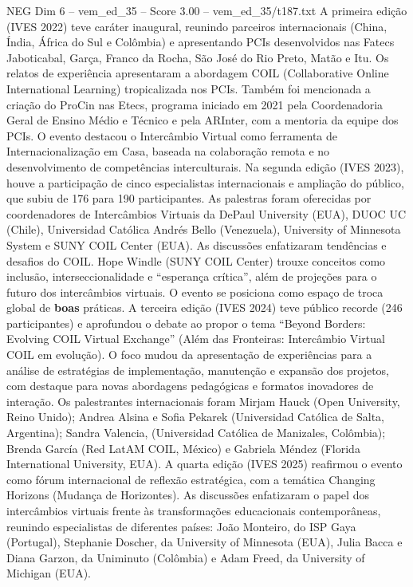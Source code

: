 \begin{textsample}{NEG Dim 6 – vem\_ed\_35 – Score 3.00 – vem\_ed\_35/t187.txt}
A primeira edição (IVES 2022) teve caráter inaugural, reunindo parceiros internacionais (China, Índia, África do Sul e Colômbia) e apresentando PCIs desenvolvidos nas Fatecs Jaboticabal, Garça, Franco da Rocha, São José do Rio Preto, Matão e Itu.
Os relatos de experiência apresentaram a abordagem COIL (Collaborative Online International Learning) tropicalizada nos PCIs.
Também foi mencionada a criação do ProCin nas Etecs, programa iniciado em 2021 pela Coordenadoria Geral de Ensino Médio e Técnico e pela ARInter, com a mentoria da equipe dos PCIs.
O evento destacou o Intercâmbio Virtual como ferramenta de Internacionalização em Casa, baseada na colaboração remota e no desenvolvimento de competências interculturais.
Na segunda edição (IVES 2023), houve a participação de cinco especialistas internacionais e ampliação do público, que subiu de 176 para 190 participantes.
As palestras foram oferecidas por coordenadores de Intercâmbios Virtuais da DePaul University (EUA), DUOC UC (Chile), Universidad Católica Andrés Bello (Venezuela), University of Minnesota System e SUNY COIL Center (EUA).
As discussões enfatizaram tendências e desafios do COIL.
Hope Windle (SUNY COIL Center) trouxe conceitos como inclusão, interseccionalidade e “esperança crítica”, além de projeções para o futuro dos intercâmbios virtuais.
O evento se posiciona como espaço de troca global de \textbf{boas} práticas.
A terceira edição (IVES 2024) teve público recorde (246 participantes) e aprofundou o debate ao propor o tema “Beyond Borders: Evolving COIL Virtual Exchange” (Além das Fronteiras: Intercâmbio Virtual COIL em evolução).
O foco mudou da apresentação de experiências para a análise de estratégias de implementação, manutenção e expansão dos projetos, com destaque para novas abordagens pedagógicas e formatos inovadores de interação.
Os palestrantes internacionais foram Mirjam Hauck (Open University, Reino Unido); Andrea Alsina e Sofia Pekarek (Universidad Católica de Salta, Argentina); Sandra Valencia, (Universidad Católica de Manizales, Colômbia); Brenda García (Red LatAM COIL, México) e Gabriela Méndez (Florida International University, EUA).
A quarta edição (IVES 2025) reafirmou o evento como fórum internacional de reflexão estratégica, com a temática Changing Horizons (Mudança de Horizontes).
As discussões enfatizaram o papel dos intercâmbios virtuais frente às transformações educacionais contemporâneas, reunindo especialistas de diferentes países: João Monteiro, do ISP Gaya (Portugal), Stephanie Doscher, da University of Minnesota (EUA), Julia Bacca e Diana Garzon, da Uniminuto (Colômbia) e Adam Freed, da University of Michigan (EUA).

\end{textsample}
